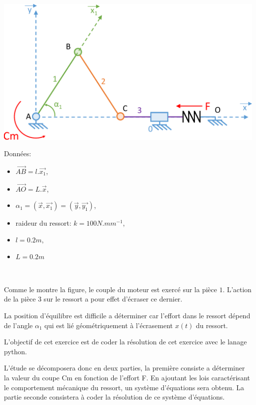 \begin{minipage}{0.45\linewidth}
\begin{center}
 \includegraphics[width=0.95\linewidth]{img/schema-cin}
\end{center}
\end{minipage}\hfill
\begin{minipage}{0.45\linewidth}
Données:
\begin{itemize}
 \item $\overrightarrow{AB}=l.\overrightarrow{x_1}$,
 \item $\overrightarrow{AO}=L.\overrightarrow{x}$,
 \item $\alpha_1=(\overrightarrow{x},\overrightarrow{x_1})=(\overrightarrow{y},\overrightarrow{y_1})$,
 \item raideur du ressort: $k=100N.mm^{-1}$,
 \item $l=0.2m$,
 \item $L=0.2m$
\end{itemize}
\end{minipage}

~\ \vspace{1cm}

Comme le montre la figure, le couple du moteur est exercé sur la pièce $1$. L'action de la pièce $3$ sur le ressort a pour effet d'écraser ce dernier.

La position d'équilibre est difficile a déterminer car l'effort dans le ressort dépend de l'angle $\alpha_1$ qui est lié géométriquement à l'écrasement $x(t)$ du ressort.

L'objectif de cet exercice est de coder la résolution de cet exercice avec le lanage python.

L'étude se décomposera donc en deux parties, la première consiste a déterminer la valeur du coupe Cm en fonction de l'effort F. En ajoutant les lois caractérisant le comportement mécanique du ressort, un système d'équations sera obtenu. La partie seconde consistera à coder la résolution de ce système d'équations.

